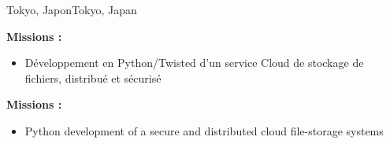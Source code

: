 {}{}{\ifnativelang Tokyo, Japon\else Tokyo, Japan\fi}{
\ifnativelang
	\textcolor{color1}{\textbf{Missions :}}
	\begin{itemize}[leftmargin=\ListItemsMargins]
		\item D\'eveloppement en Python/Twisted d'un service Cloud de stockage de fichiers, distribu\'e et s\'ecuris\'e
	\end{itemize}
\else
	\textcolor{color1}{\textbf{Missions :}}
	\begin{itemize}[leftmargin=\ListItemsMargins]
		\item Python development of a secure and distributed cloud file-storage systems
	\end{itemize}
\fi
}

\vspace{\ItemsMaxSpacing}

